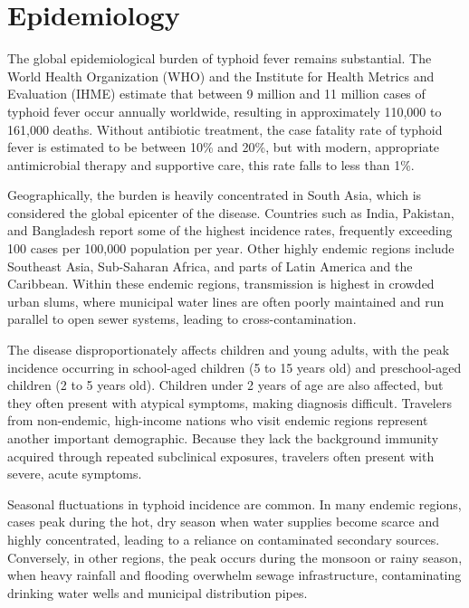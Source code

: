 \section*{Epidemiology}
The global epidemiological burden of typhoid fever remains substantial. The World Health Organization (WHO) and the Institute for Health Metrics and Evaluation (IHME) estimate that between 9 million and 11 million cases of typhoid fever occur annually worldwide, resulting in approximately 110,000 to 161,000 deaths. Without antibiotic treatment, the case fatality rate of typhoid fever is estimated to be between 10\% and 20\%, but with modern, appropriate antimicrobial therapy and supportive care, this rate falls to less than 1\%.

Geographically, the burden is heavily concentrated in South Asia, which is considered the global epicenter of the disease. Countries such as India, Pakistan, and Bangladesh report some of the highest incidence rates, frequently exceeding 100 cases per 100,000 population per year. Other highly endemic regions include Southeast Asia, Sub-Saharan Africa, and parts of Latin America and the Caribbean. Within these endemic regions, transmission is highest in crowded urban slums, where municipal water lines are often poorly maintained and run parallel to open sewer systems, leading to cross-contamination.

The disease disproportionately affects children and young adults, with the peak incidence occurring in school-aged children (5 to 15 years old) and preschool-aged children (2 to 5 years old). Children under 2 years of age are also affected, but they often present with atypical symptoms, making diagnosis difficult. Travelers from non-endemic, high-income nations who visit endemic regions represent another important demographic. Because they lack the background immunity acquired through repeated subclinical exposures, travelers often present with severe, acute symptoms.

Seasonal fluctuations in typhoid incidence are common. In many endemic regions, cases peak during the hot, dry season when water supplies become scarce and highly concentrated, leading to a reliance on contaminated secondary sources. Conversely, in other regions, the peak occurs during the monsoon or rainy season, when heavy rainfall and flooding overwhelm sewage infrastructure, contaminating drinking water wells and municipal distribution pipes.


